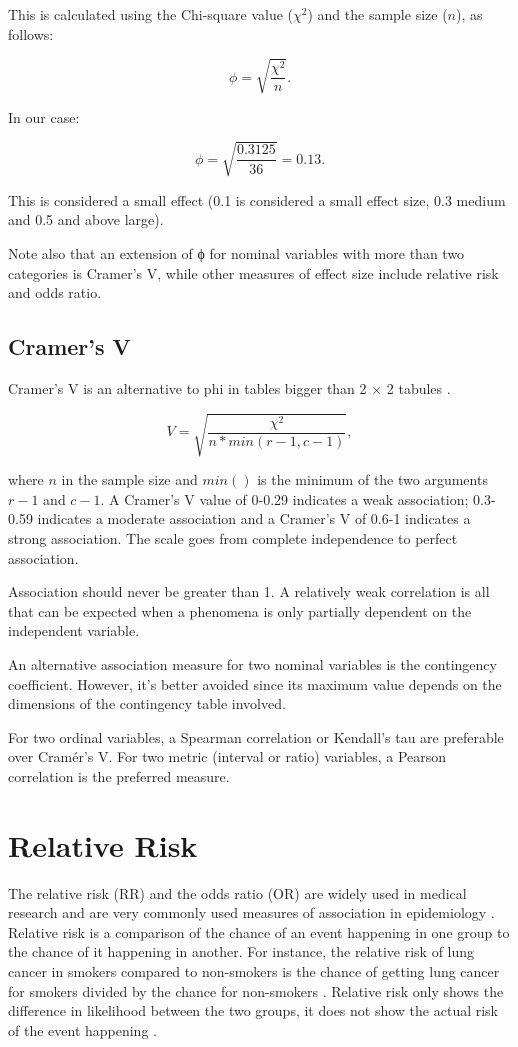 \documentclass[
]{book}
\begin{document}
This is calculated using the Chi-square value (\(\chi^2\)) and the sample size (\(n\)), as follows:

\[\phi=\sqrt{\frac{\chi^2}{n}}.\]

In our case:

\[\phi=\sqrt{\frac{0.3125}{36}}=0.13.\]

This is considered a small effect (0.1 is considered a small effect size, 0.3 medium and 0.5 and above large).

Note also that an extension of ϕ for nominal variables with more than two categories is Cramer's V, while other measures of effect size include relative risk and odds ratio.

\hypertarget{cramers-v}{%
\subsection{Cramer's V}\label{cramers-v}}

Cramer's V is an alternative to phi in tables bigger than 2 \(\times\) 2 tabules \citep{akoglu}.

\[V = \sqrt{\frac{\chi^2}{n*min(r-1,c-1)}},\]

where \(n\) in the sample size and \(min()\) is the minimum of the two arguments \(r-1\) and \(c-1\). A Cramer's V value of 0-0.29 indicates a weak association; 0.3-0.59 indicates a moderate association and a Cramer's V of 0.6-1 indicates a strong association. The scale goes from complete independence to perfect association.

Association should never be greater than 1. A relatively weak correlation is all that can be expected when a phenomena is only partially dependent on the independent variable.

An alternative association measure for two nominal variables is the contingency coefficient. However, it's better avoided since its maximum value depends on the dimensions of the contingency table involved.

For two ordinal variables, a Spearman correlation or Kendall's tau are preferable over Cramér's V. For two metric (interval or ratio) variables, a Pearson correlation is the preferred measure.

\hypertarget{relative-risk}{%
\section{Relative Risk}\label{relative-risk}}

The relative risk (RR) and the odds ratio (OR) are widely used in medical research and are very commonly used measures of association in epidemiology \citep{schmidtty}. Relative risk is a comparison of the chance of an event happening in one group to the chance of it happening in another. For instance, the relative risk of lung cancer in smokers compared to non-smokers is the chance of getting lung cancer for smokers divided by the chance for non-smokers \citep{tenny}. Relative risk only shows the difference in likelihood between the two groups, it does not show the actual risk of the event happening \citep{tenny}.
\end{document}

